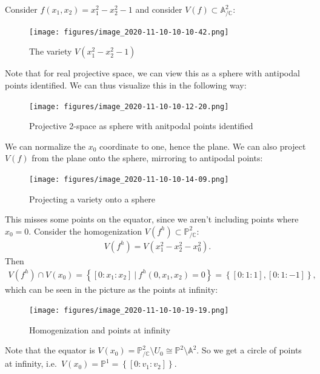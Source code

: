 \begin{example}[?]

Consider \(f(x_1, x_2) = x_1^2 - x_2^2 - 1\) and consider
\(V(f) \subset {\mathbb{A}}^2_{/{\mathbb{C}}}\):

\begin{figure}
\centering
\texttt{[image: figures/image\_2020-11-10-10-10-42.png]}
\caption{The variety \(V(x_1^2 - x_2^2 - 1)\)}
\end{figure}

Note that for real projective space, we can view this as a sphere with
antipodal points identified. We can thus visualize this in the following
way:

\begin{figure}
\centering
\texttt{[image: figures/image\_2020-11-10-10-12-20.png]}
\caption{Projective 2-space as sphere with anitpodal points identified}
\end{figure}

We can normalize the \(x_0\) coordinate to one, hence the plane. We can
also project \(V(f)\) from the plane onto the sphere, mirroring to
antipodal points:

\begin{figure}
\centering
\texttt{[image: figures/image\_2020-11-10-10-14-09.png]}
\caption{Projecting a variety onto a sphere}
\end{figure}

This misses some points on the equator, since we aren't including points
where \(x_0 = 0\). Consider the homogenization
\(V(f^h) \subset {\mathbb{P}}^2_{/{\mathbb{C}}}\):
\begin{align*}  
V(f^h) = V(x_1^2 - x_2^2 - x_0^2)
.\end{align*}
Then
\begin{align*}  
V(f^h) \cap V(x_0) = \left\{{{\left[ {0:x_1:x_2} \right]} {~\mathrel{\Big|}~}f^h(0, x_1, x_2) = 0 }\right\} = \left\{{{\left[ {0:1:1} \right]}, {\left[ {0:1:-1} \right]}}\right\}
,\end{align*}
which can be seen in the picture as the points at infinity:

\begin{figure}
\centering
\texttt{[image: figures/image\_2020-11-10-10-19-19.png]}
\caption{Homogenization and points at infinity}
\end{figure}

Note that the equator is
\(V(x_0) = {\mathbb{P}}^2_{/{\mathbb{C}}}\setminus U_0 \cong {\mathbb{P}}^2\setminus{\mathbb{A}}^2\).
So we get a circle of points at infinity,
i.e.~\(V(x_0) = {\mathbb{P}}^1 = \left\{{{\left[ {0:v_1:v_2} \right]}}\right\}\).

\end{example}

